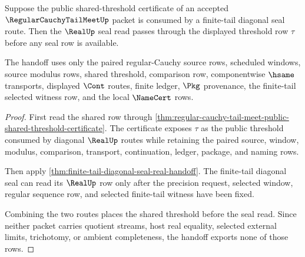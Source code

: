 \begin{theorem}
\label{thm:regular-cauchy-tail-meet-limit-seal-threshold-handoff}
Suppose the public shared-threshold certificate of an accepted $\RegularCauchyTailMeetUp$ packet is consumed by a finite-tail diagonal seal route. Then the $\RealUp$ seal read passes through the displayed threshold row $\tau$ before any seal row is available.

The handoff uses only the paired regular-Cauchy source rows, scheduled windows, source modulus rows, shared threshold, comparison row, componentwise $\hsame$ transports, displayed $\Cont$ routes, finite ledger, $\Pkg$ provenance, the finite-tail selected witness row, and the local $\NameCert$ rows.
\end{theorem}
\begin{proof}
First read the shared row through \autoref{thm:regular-cauchy-tail-meet-public-shared-threshold-certificate}. The certificate exposes $\tau$ as the public threshold consumed by diagonal $\RealUp$ routes while retaining the paired source, window, modulus, comparison, transport, continuation, ledger, package, and naming rows.

Then apply \autoref{thm:finite-tail-diagonal-seal-real-handoff}. The finite-tail diagonal seal can read its $\RealUp$ row only after the precision request, selected window, regular sequence row, and selected finite-tail witness have been fixed.

Combining the two routes places the shared threshold before the seal read. Since neither packet carries quotient streams, host real equality, selected external limits, trichotomy, or ambient completeness, the handoff exports none of those rows.
\end{proof}

